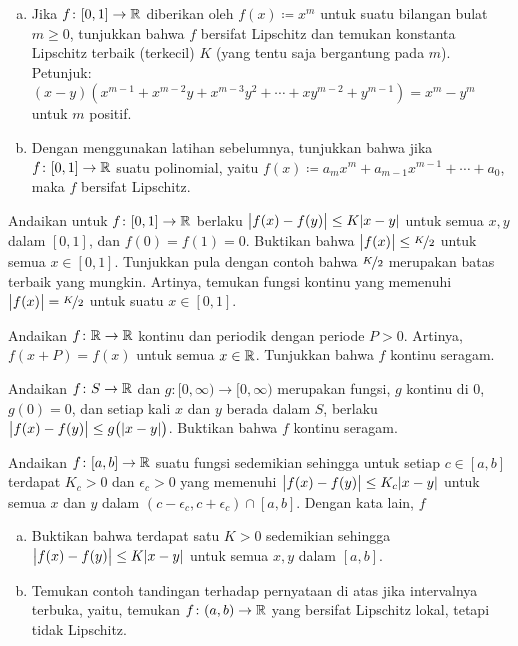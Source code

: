 \begin{exercise}
\pagebreak[2]
\leavevmode
\begin{enumerate}[a)]
\item
Jika $f \colon [0,1] \to {\mathbb{R}}$ diberikan oleh $f(x) \coloneqq x^m$ untuk suatu bilangan bulat
$m \geq 0$,
tunjukkan bahwa $f$ bersifat Lipschitz dan temukan konstanta Lipschitz terbaik (terkecil)
$K$ (yang tentu saja bergantung pada $m$).
Petunjuk:
$(x-y)(x^{m-1} + x^{m-2}y + x^{m-3}y^2 + \cdots + x y^{m-2} + y^{m-1}) = x^m
- y^m$ untuk $m$ positif.
\item
Dengan menggunakan latihan sebelumnya, tunjukkan bahwa jika $f \colon [0,1] \to {\mathbb{R}}$
suatu polinomial, yaitu $f(x) \coloneqq a_m x^m + a_{m-1} x^{m-1} + \cdots + a_0$,
maka $f$ bersifat Lipschitz.
\end{enumerate}
\end{exercise}

\begin{exercise}
\pagebreak[2]
Andaikan untuk $f \colon [0,1] \to {\mathbb{R}}$ berlaku $\bigl\lvert {f(x)-f(y)} \bigr\rvert \leq K
\lvert {x-y} \rvert$ untuk semua $x,y$ dalam $[0,1]$,
dan $f(0) = f(1) = 0$.
Buktikan bahwa $\bigl\lvert {f(x)} \bigr\rvert \leq \nicefrac{K}{2}$ untuk semua $x \in [0,1]$.  Tunjukkan pula dengan contoh bahwa
$\nicefrac{K}{2}$ merupakan batas terbaik yang mungkin.
Artinya, temukan fungsi kontinu
yang memenuhi $\bigl\lvert {f(x)} \bigr\rvert = \nicefrac{K}{2}$ untuk suatu $x \in [0,1]$.
\end{exercise}

\begin{exercise}
Andaikan $f \colon {\mathbb{R}} \to {\mathbb{R}}$ kontinu dan periodik dengan periode
$P > 0$.  Artinya, $f(x+P) = f(x)$ untuk semua $x \in {\mathbb{R}}$.  Tunjukkan bahwa $f$
kontinu seragam.
\end{exercise}

\begin{exercise}
Andaikan $f \colon S \to {\mathbb{R}}$ dan $g \colon [0,\infty) \to [0,\infty)$
merupakan fungsi, $g$ kontinu di $0$, $g(0) = 0$, dan
setiap kali $x$ dan $y$ berada dalam $S$, berlaku $\bigl\lvert {f(x)-f(y)} \bigr\rvert \leq
g\bigl(\lvert {x-y} \rvert\bigr)$.
Buktikan bahwa $f$ kontinu seragam.
\end{exercise}

\begin{exercise}
Andaikan $f \colon [a,b] \to {\mathbb{R}}$ suatu fungsi sedemikian sehingga untuk setiap $c \in
[a,b]$ terdapat $K_c > 0$ dan $\epsilon_c > 0$ yang memenuhi
$\bigl\lvert {f(x)-f(y)} \bigr\rvert \leq K_c \lvert {x-y} \rvert$ untuk semua $x$ dan $y$ dalam
$(c-\epsilon_c,c+\epsilon_c) \cap [a,b]$.  Dengan kata lain, $f$
\begin{enumerate}[a)]
\item
Buktikan bahwa terdapat satu $K > 0$ sedemikian sehingga
$\bigl\lvert {f(x)-f(y)} \bigr\rvert \leq K \lvert {x-y} \rvert$ untuk semua $x,y$ dalam $[a,b]$.
\item
Temukan contoh tandingan terhadap pernyataan di atas jika intervalnya terbuka, yaitu,
temukan $f \colon (a,b) \to {\mathbb{R}}$ yang bersifat Lipschitz lokal, tetapi tidak
Lipschitz.
\end{enumerate}
\end{exercise}

